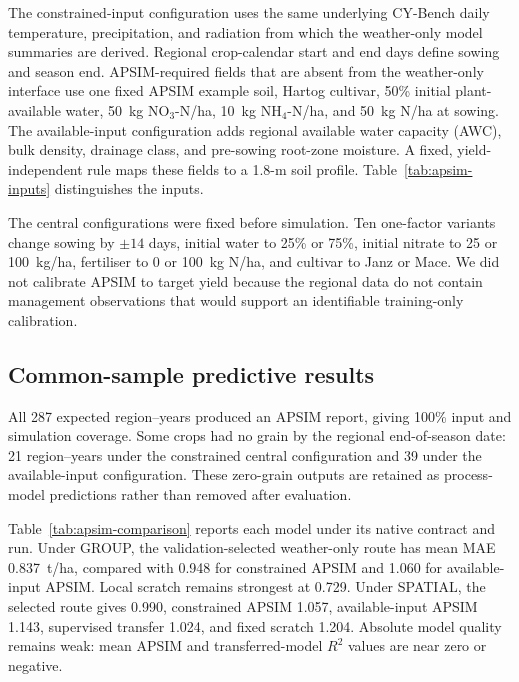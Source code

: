 \documentclass[runningheads]{venue/lncs/llncs}
\begin{document}
The constrained-input configuration uses the same underlying CY-Bench daily temperature, precipitation, and radiation from which the weather-only model summaries are derived. Regional crop-calendar start and end days define sowing and season end. APSIM-required fields that are absent from the weather-only interface use one fixed APSIM example soil, Hartog cultivar, 50\% initial plant-available water, 50~kg NO$_3$-N/ha, 10~kg NH$_4$-N/ha, and 50~kg N/ha at sowing. The available-input configuration adds regional available water capacity (AWC), bulk density, drainage class, and pre-sowing root-zone moisture. A fixed, yield-independent rule maps these fields to a 1.8-m soil profile. Table~\ref{tab:apsim-inputs} distinguishes the inputs.



The central configurations were fixed before simulation. Ten one-factor variants change sowing by $\pm14$ days, initial water to 25\% or 75\%, initial nitrate to 25 or 100~kg/ha, fertiliser to 0 or 100~kg N/ha, and cultivar to Janz or Mace. We did not calibrate APSIM to target yield because the regional data do not contain management observations that would support an identifiable training-only calibration.

\subsection{Common-sample predictive results}

All 287 expected region--years produced an APSIM report, giving 100\% input and simulation coverage. Some crops had no grain by the regional end-of-season date: 21 region--years under the constrained central configuration and 39 under the available-input configuration. These zero-grain outputs are retained as process-model predictions rather than removed after evaluation.

Table~\ref{tab:apsim-comparison} reports each model under its native contract and run. Under GROUP, the validation-selected weather-only route has mean MAE 0.837~t/ha, compared with 0.948 for constrained APSIM and 1.060 for available-input APSIM. Local scratch remains strongest at 0.729. Under SPATIAL, the selected route gives 0.990, constrained APSIM 1.057, available-input APSIM 1.143, supervised transfer 1.024, and fixed scratch 1.204. Absolute model quality remains weak: mean APSIM and transferred-model $R^2$ values are near zero or negative.


\end{document}

